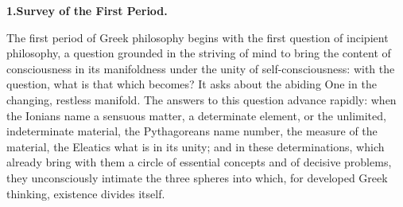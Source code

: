 \begin{center}
\textbf{1.\enspace Survey of the First Period.}
\end{center}

The first period of Greek philosophy begins with the first question
of incipient philosophy, a question grounded in the striving of mind to
bring the content of consciousness in its manifoldness under the unity
of self-consciousness: with the question, what is that which becomes?
It asks about the abiding One in the changing, restless manifold. The
answers to this question advance rapidly: when the Ionians name a
sensuous matter, a determinate element, or the unlimited, indeterminate
material, the Pythagoreans name number, the measure of the material,
the Eleatics what is in its unity; and in these determinations, which
already bring with them a circle of essential concepts and of decisive
problems, they unconsciously intimate the three spheres into which, for
developed Greek thinking, existence divides itself.

